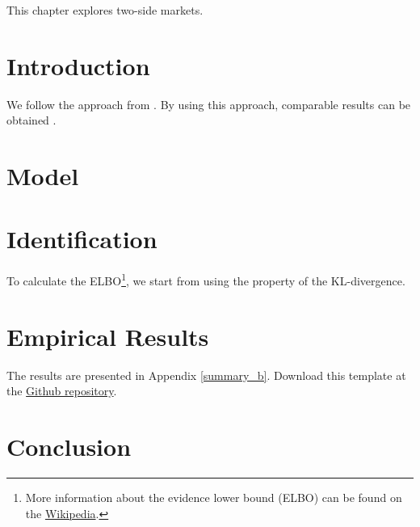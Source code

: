 This chapter explores two-side markets. \lipsum[30]

\section{Introduction}
We follow the approach from \cite{HL2019}. \lipsum[50] By using this approach, comparable results can be obtained \citep{CES2013}.

\section{Model}
\lipsum[53]

\section{Identification}
\lipsum[16] To calculate the ELBO\footnote{More information about the evidence lower bound (ELBO) can be found on the \href{https://en.wikipedia.org/wiki/Evidence_lower_bound}{Wikipedia}. }, we start from using the property of the KL-divergence.


\section{Empirical Results}
The results are presented in Appendix \ref{summary_b}. Download this template at the \href{https://github.com/howardhsumail/Dissertation-LaTeX-Template.git}{Github repository}.

\section{Conclusion}
\lipsum[70]